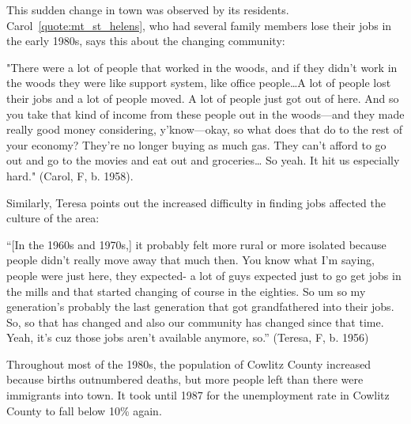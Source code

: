 This sudden change in town was observed by its residents. Carol~\ref{quote:mt_st_helens}, who had several family members lose their jobs in the early 1980s, says this about the changing community:
\begin{num_quote}
    "There were a lot of people that worked in the woods, and if they didn't work in the woods they were like support system, like office people\ldots A lot of people lost their jobs and a lot of people moved. A lot of people just got out of here. And so you take that kind of income from these people out in the woods—and they made really good money considering, y'know—okay, so what does that do to the rest of your economy? They're no longer buying as much gas. They can't afford to go out and go to the movies and eat out and groceries… So yeah. It hit us especially hard." (Carol, F, b. 1958).
\label{quote:mt_st_helens}
\end{num_quote}
Similarly, Teresa points out the increased difficulty in finding jobs affected the culture of the area:
\begin{num_quote}
    ``[In the 1960s and 1970s,] it probably felt more rural or more isolated because people didn't really move away that much then. You know what I'm saying, people were just here, they expected- a lot of guys expected just to go get jobs in the mills and that started changing of course in the eighties. So um so my generation's probably the last generation that got grandfathered into their jobs. So, so that has changed and also our community has changed since that time. Yeah, it's cuz those jobs aren't available anymore, so.'' (Teresa, F, b. 1956)
\label{quote:changed_culture}
\end{num_quote}
Throughout most of the 1980s, the population of Cowlitz County increased because births outnumbered deaths, but more people left than there were immigrants into town. It took until 1987 for the unemployment rate in Cowlitz County to fall below 10\% again.

